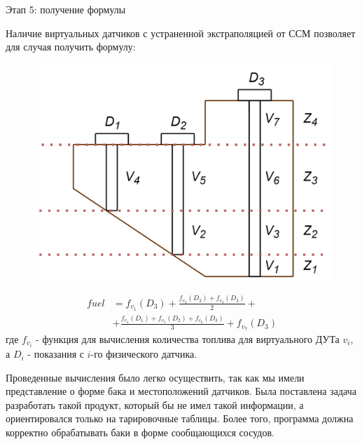 \documentclass[usenames,dvipsnames,11pt]{beamer}
\begin{document}
\begin{frame}{Этап 5: получение формулы}
	
	\begin{minipage}[h]{0.55\linewidth}
	Наличие виртуальных датчиков с устраненной экстраполяцией от ССМ позволяет для случая получить формулу:
	\end{minipage}
	\hfill
	\begin{minipage}[h]{0.4\linewidth}
		\begin{figure}
				\centering
				\includegraphics[width=1\linewidth]{graphics/screenshot008}
			\end{figure}
	\end{minipage}
	
	\begin{align*}
	    fuel &= f_{v_1}(D_3)+\frac{f_{v_2}(D_2)+f_{v_3}(D_3)}{2} +  \\        
	         &+ \frac{f_{v_4}(D_1)+f_{v_5} (D_2)+f_{v_6}(D_3)}{3}+f_{v_7}(D_3)
	\end{align*}
	где $f_{v_i}$ - функция для вычисления количества топлива для виртуального ДУТа ${v_i}$, а $D_i$ - показания с $i$-го физического датчика.
\end{frame}

\begin{frame}
	Проведенные вычисления было легко осуществить, так как мы имели представление о форме бака и местоположений датчиков.
	\bigbreak
	Была поставлена задача разработать такой продукт, который бы не имел такой информации, а ориентировался только на тарировочные таблицы.
	\bigbreak
	Более того, программа должна корректно обрабатывать баки в форме сообщающихся сосудов.
\end{frame}
\end{document}

